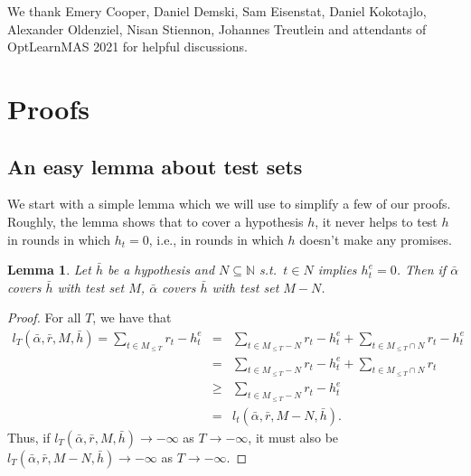 \documentclass[submission,copyright,creativecommons]{eptcs}
\newtheorem{lemma}[theorem]{Lemma}
\begin{document}
We thank Emery Cooper, Daniel Demski, Sam Eisenstat, Daniel Kokotajlo, Alexander Oldenziel, Nisan Stiennon, Johannes Treutlein and attendants of OptLearnMAS 2021 for helpful discussions.
%

%

%
%






%

%
%
%
%
%

\appendix

\section{Proofs}
\label{appendix:proofs}

\subsection{An easy lemma about test sets}

We start with a simple lemma which we will use to simplify a few of our proofs. Roughly, the lemma shows that to cover a hypothesis $h$, it never helps to test $h$ in rounds in which $h_t=0$, i.e., in rounds in which $h$ doesn't make any promises.

\begin{lemma}\label{lemma:testing-positive-estimate}
Let $\bar h$ be a hypothesis and $N\subseteq \mathbb{N}$ s.t.\ $t\in N$ implies $h^e_t=0$. Then if $\bar\alpha$ covers $\bar h$ with test set $M$, $\bar\alpha$ covers $\bar h$ with test set $M-N$.
\end{lemma}

\begin{proof}
For all $T$, we have that
\begin{eqnarray*}
l_T(\bar\alpha,\bar r, M, \bar h) = \sum_{t\in M_{\leq T}} r_t - h_t^e &=& \sum_{t\in M_{\leq T} - N} r_t - h_t^e + \sum_{t\in M_{\leq T} \cap N} r_t - h_t^e\\
&=& \sum_{t\in M_{\leq T} - N} r_t - h_t^e + \sum_{t\in M_{\leq T} \cap N} r_t\\
&\geq & \sum_{t\in M_{\leq T} - N} r_t - h_t^e\\
&=& l_t(\bar \alpha, \bar r, M-N, \bar h).
\end{eqnarray*}
Thus, if $l_T(\bar\alpha,\bar r, M, \bar h)\rightarrow -\infty$ as $T\rightarrow -\infty$, it must also be $l_T(\bar\alpha,\bar r, M-N, \bar h)\rightarrow -\infty$ as $T\rightarrow -\infty$.
\end{proof}
\end{document}
